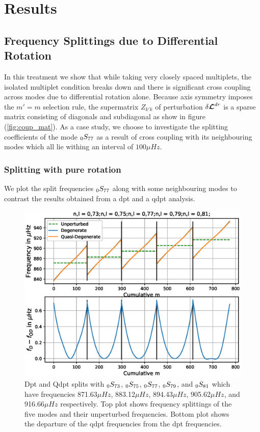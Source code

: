 \chapter{Results}  %

\ifpdf
    \graphicspath{{Chapter1/Figs/Raster/}{Chapter1/Figs/PDF/}{Chapter1/Figs/}}
\else
    \graphicspath{{Chapter1/Figs/Vector/}{Chapter1/Figs/}}
\fi



\section{Frequency Splittings due to Differential Rotation} %
In this treatment we show that while taking very closely spaced multiplets, the isolated multiplet condition breaks down and there is significant cross coupling across modes due to differential rotation alone. Because axis symmetry imposes the $m'=m$ selection rule, the supermatrix $Z_{k'k}$ of perturbation $\delta \bm{\mathcal{L}}^{dr}$ is a sparse matrix consisting of diagonals and subdiagonal as show in figure (\ref{fig:coup_mat}). As a case study, we choose to investigate the splitting coefficients of the mode $_{0}S_{77}$ as a result of cross coupling with its neighbouring modes which all lie withing an interval of $100\mu Hz$.

\subsection{Splitting with pure rotation}
We plot the split frequencies $_{0}S_{77}$ along with some neighbouring modes to contrast the results obtained from a dpt and a qdpt analysis.

\begin{figure}[h!]
\includegraphics[scale=0.8,center]{Chapter4/figs/dr_split}
\caption{Dpt and Qdpt splits with $_{0}S_{73}$, $_{0}S_{75}$, $_{0}S_{77}$, $_{0}S_{79}$, and $_{0}S_{81}$ which have frequencies 871.63$\mu Hz$, 883.12$\mu Hz$, 894.43$\mu Hz$, 905.62$\mu Hz$, and 916.66$\mu Hz$ respectively. Top plot shows frequency splittings of the five modes and their unperturbed frequencies. Bottom plot shows the departure of the qdpt frequencies from the dpt frequencies.}
\label{fig:split_dr}
\end{figure}

